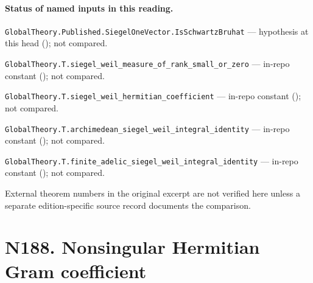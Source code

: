 
\paragraph{Status of named inputs in this reading.}
\noindent\nolinkurl{GlobalTheory.Published.SiegelOneVector.IsSchwartzBruhat} --- hypothesis at this head (); not compared.\par
\noindent\nolinkurl{GlobalTheory.T.siegel_weil_measure_of_rank_small_or_zero} --- in-repo constant (); not compared.\par
\noindent\nolinkurl{GlobalTheory.T.siegel_weil_hermitian_coefficient} --- in-repo constant (); not compared.\par
\noindent\nolinkurl{GlobalTheory.T.archimedean_siegel_weil_integral_identity} --- in-repo constant (); not compared.\par
\noindent\nolinkurl{GlobalTheory.T.finite_adelic_siegel_weil_integral_identity} --- in-repo constant (); not compared.\par
External theorem numbers in the original excerpt are not verified here unless a separate edition-specific source record documents the comparison.

\section*{N188. Nonsingular Hermitian Gram coefficient}

